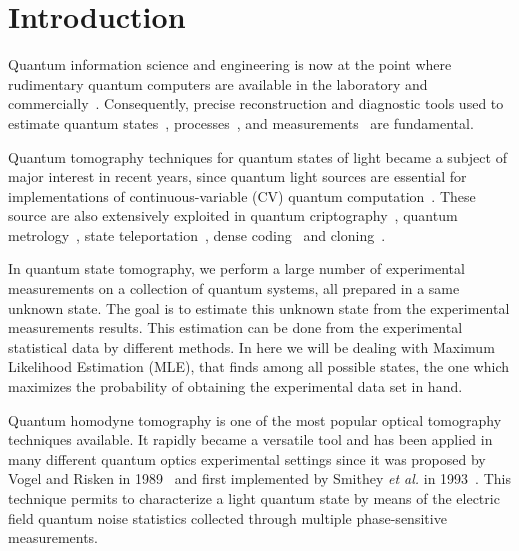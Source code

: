 \documentclass[
reprint,
superscriptaddress,
showpacs,
amsmath,
amssymb,
aps,
pra,
longbibliography
]{revtex4-1}
\begin{document}
\section{Introduction}
\label{intro}
Quantum information science and engineering is now at the point where 
rudimentary quantum computers are available in the laboratory and 
commercially~\cite{kandala2017,Linke2017,Monk2017,Denchev2016}.
Consequently, precise reconstruction and diagnostic tools used to estimate 
quantum states~\cite{Vogel1989, Smithey1993, Dunn1995, Banaszek1999, Banaszek2000, White2002, Ourjoumtsev2007, Neergaard2006}, 
processes~\cite{Chuang1997, Poyatos1997, Altepeter2003, Dariano1998, Nielsen1998, Mitchell2003, Obrien2004,Kupchak2015}, and 
measurements~\cite{Luis1999, Fiurasek2001, Dariano2004, Lundeen2009} are fundamental.

Quantum tomography techniques for quantum states of light became a subject of
major interest in recent years, since quantum light sources are essential
for implementations of continuous-variable (CV) quantum computation~\cite{Lloyd1999, Gottesman2001, Bartlett2002, Jeong2002, Ralph2003}. 
These source are also extensively exploited in quantum criptography~\cite{Ralph1999, Hillery2000, Silberhorn2002, Pirandola2008, Luiz2017}, 
quantum metrology~\cite{Eberle2010, Demkowicz2013}, state teleportation~\cite{Vaidman1994, Braunstein1998, He2015}, dense 
coding~\cite{Braunstein2000, Lee2014} and cloning~\cite{Cerf2000, Braunstein2001}. 

In quantum state tomography, we perform a large number of experimental measurements on
a collection of quantum systems, all prepared in a same unknown state. The goal is to
estimate this unknown state from the experimental measurements results. This estimation can be done from the experimental statistical data by different methods. In here we will be dealing with Maximum Likelihood Estimation (MLE), that finds among all possible states, the one which maximizes the probability of obtaining the experimental data set in hand. 

Quantum homodyne tomography is one of the most popular optical tomography techniques
available. It rapidly became a versatile tool and has been applied in many different quantum optics experimental settings since it was proposed by Vogel and Risken in 1989~\cite{Vogel1989} and first implemented by Smithey \textit{et al.} in 1993~\cite{Smithey1993}. This technique permits to characterize a light quantum state by means of the electric field quantum noise statistics collected through multiple phase-sensitive measurements. 
\end{document}
